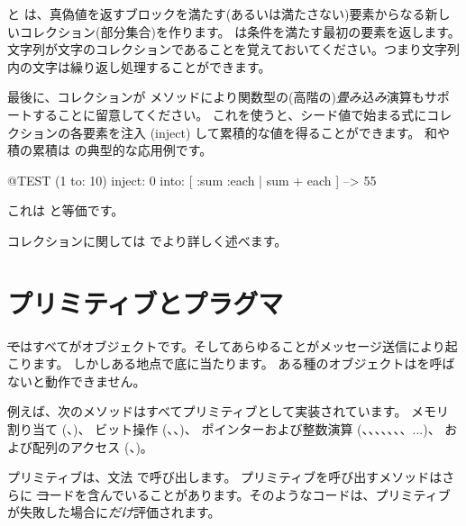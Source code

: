 \documentclass[a4paper,10pt,twoside]{book}
\begin{document}
 と  は、真偽値を返すブロックを満たす(あるいは満たさない)要素からなる新しいコレクション(部分集合)を作ります。
 は条件を満たす最初の要素を返します。
文字列が文字のコレクションであることを覚えておいてください。つまり文字列内の文字は繰り返し処理することができます。


最後に、コレクションが  メソッドにより関数型の(高階の)\emph{畳み込み}演算もサポートすることに留意してください。
これを使うと、シード値で始まる式にコレクションの各要素を注入 (inject) して累積的な値を得ることができます。
和や積の累積は  の典型的な応用例です。

\begin{code}{@TEST}
(1 to: 10) inject: 0 into: [ :sum :each | sum + each ] --> 55
\end{code}

\noindent
これは と等価です。

コレクションに関しては  でより詳しく述べます。

\section{プリミティブとプラグマ}

\st ではすべてがオブジェクトです。そしてあらゆることがメッセージ送信により起こります。
しかしある地点で底に当たります。
ある種のオブジェクトはを呼ばないと動作できません。

例えば、次のメソッドはすべてプリミティブとして実装されています。
メモリ割り当て (、)、
ビット操作 (、、)、
ポインターおよび整数演算 (\ct{+}、\ct{-}、\ct{<}、\ct{>}、\ct{*}、\ct{/ }、\ct{=}、\ct{==}...)、
および配列のアクセス (、)。

プリミティブは、文法  で呼び出します。
プリミティブを呼び出すメソッドはさらに \st コードを含んでいることがあります。そのようなコードは、プリミティブが失敗した場合に\emph{だけ}評価されます。
\end{document}
